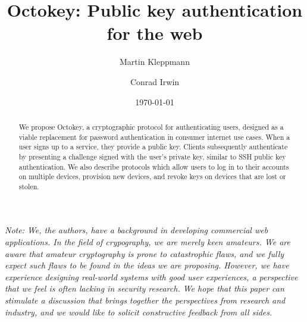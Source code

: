 \documentclass{article}
\begin{document}
\title{Octokey: Public key authentication for the web}
\author{Martin Kleppmann \and Conrad Irwin}
\date{\today}
\maketitle

\begin{abstract}
We propose Octokey, a cryptographic protocol for authenticating users, designed as a viable
replacement for password authentication in consumer internet use cases. When a user signs up to a
service, they provide a public key. Clients subsequently authenticate by presenting a challenge
signed with the user's private key, similar to SSH public key authentication. We also describe
protocols which allow users to log in to their accounts on multiple devices, provision new devices,
and revoke keys on devices that are lost or stolen.
\end{abstract}

\emph{Note: We, the authors, have a background in developing commercial web applications. In the
field of crypography, we are merely keen amateurs. We are aware that amateur cryptography is prone
to catastrophic flaws, and we fully expect such flaws to be found in the ideas we are proposing.
However, we have experience designing real-world systems with good user experiences, a perspective
that we feel is often lacking in security research. We hope that this paper can stimulate a
discussion that brings together the perspectives from research and industry, and we would like to
solicit constructive feedback from all sides.}








{}

\end{document}
